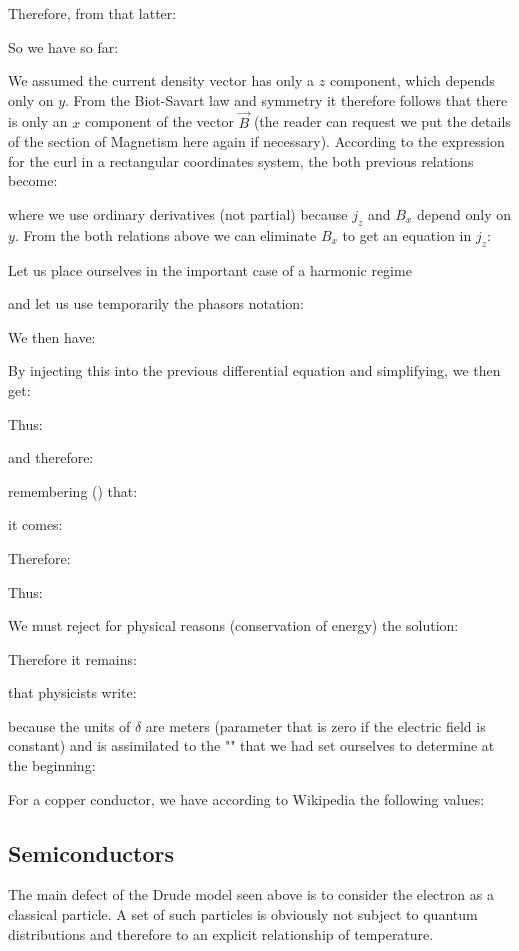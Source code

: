	Therefore, from that latter:
	
	So we have so far:	
	
	We assumed the current density vector has only a $z$ component, which depends only on $y$. From the Biot-Savart law and symmetry it therefore follows that there is only an $x$ component of the vector $\vec{B}$ (the reader can request we put the details of the section of Magnetism here again if necessary). According to the expression for the curl in a rectangular coordinates system, the both previous relations become:
	
	where we use ordinary derivatives (not partial) because $j_z$ and $B_x$ depend only on $y$.
	From the both relations above we can eliminate $B_x$ to get an equation in $j_z$:
	
	Let us place ourselves in the important case of a harmonic regime
	
	and let us use temporarily the phasors notation:
	
	We then have:
	
	By injecting this into the previous differential equation and simplifying, we then get:
	
	Thus:
	
	and therefore:
	
	remembering () that:
	
	it comes:
	
	Therefore:
	
	Thus:
	
	We must reject for physical reasons (conservation of energy) the solution:
	
	Therefore it remains:
	
	that physicists write:
	
	because the units of $\delta$ are meters (parameter that is zero if the electric field is constant) and is assimilated to the "" that we had set ourselves to determine at the beginning:
	
	For a copper conductor, we have according to Wikipedia the following values:
	

	\pagebreak
	\subsection{Semiconductors}
	The main defect of the Drude model seen above is to consider the electron as a classical particle. A set of such particles is obviously not subject to quantum distributions and therefore to an explicit relationship of temperature.

